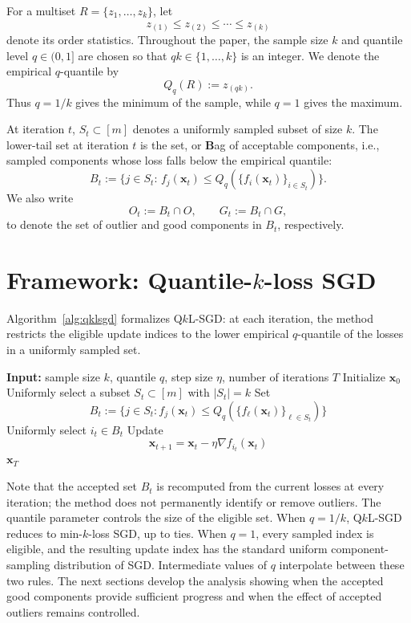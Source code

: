 \documentclass[11pt]{article}
\newcommand{\ve}[1]{\mathbf{#1}}
\begin{document}
For a multiset \(R=\{z_1,\ldots,z_k\}\), let
\[
z_{(1)}\le z_{(2)}\le\cdots\le z_{(k)}
\]
denote its order statistics. Throughout the paper, the sample size \(k\) and quantile level \(q\in(0,1]\) are
chosen so that \(qk\in\{1,\ldots,k\}\) is an integer. We denote the empirical
\(q\)-quantile by
\[
Q_q(R):=z_{( qk)}.
\]
Thus \(q=1/k\) gives the minimum of the sample, while \(q=1\) gives the maximum.

At iteration \(t\), \(S_t\subset[m]\) denotes a uniformly sampled subset of size
\(k\). {The lower-tail set at iteration $t$ is the set, or \textbf{B}ag of acceptable components, i.e., sampled components whose loss falls below the empirical quantile:}
\[
B_t
:=
\{j\in S_t:\,
f_j(\ve{x}_t)\le Q_q(\{f_i(\ve{x}_t)\}_{i\in S_t})\}.
\]
We also write
\[
O_t:=B_t\cap O,
\qquad
G_t:=B_t\cap G,
\]
{to denote the set of outlier and good components in $B_t$, respectively.}
\section{Framework: Quantile-\(k\)-loss SGD}
\label{sec:algorithm}

Algorithm~\ref{alg:qklsgd} formalizes Q\(k\)L-SGD: at each iteration, the
method restricts the eligible update indices to the lower empirical
\(q\)-quantile of the losses in a uniformly sampled set.


\begin{algorithm}
    \caption{Quantile-\(k\)-loss SGD (Q\(k\)L-SGD)}
    \label{alg:qklsgd}
    \begin{algorithmic}[1]
    \STATE \textbf{Input:} sample size \(k\), quantile \(q\), step size \(\eta\), number of iterations \(T\)
    \STATE Initialize \(\ve{x}_0\)
        \STATE Uniformly select a subset \(S_t\subset [m]\) with \(|S_t|=k\)
        \STATE Set
        \[
        B_t
        :=
        \{j\in S_t:
        f_j(\ve{x}_t)
        \le
        Q_q(\{f_\ell(\ve{x}_t)\}_{\ell\in S_t})\}
        \]
        \STATE Uniformly select \(i_t\in B_t\)
        \STATE Update
        \[
        \ve{x}_{t+1}
        =
        \ve{x}_t-\eta\nabla f_{i_t}(\ve{x}_t)
        \]
    \ENDFOR
    \RETURN \(\ve{x}_T\)
    \end{algorithmic}
\end{algorithm}


Note that the accepted set \(B_t\) is recomputed from the current losses at every
iteration; the method does not permanently identify or remove outliers. The
quantile parameter controls the size of the eligible set. When \(q=1/k\),
Q\(k\)L-SGD reduces to min-\(k\)-loss SGD, up to ties. When \(q=1\), every
sampled index is eligible, and the resulting update index has the standard
uniform component-sampling distribution of SGD. Intermediate values of \(q\)
interpolate between these two rules. The next sections develop the analysis showing when the
accepted good components provide sufficient progress and when the effect of
accepted outliers remains controlled.
\end{document}
